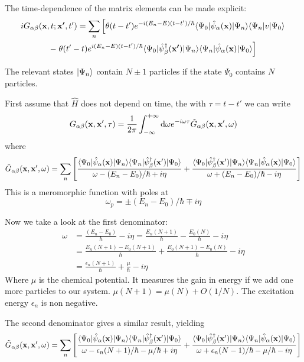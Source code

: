 The time-dependence of the matrix elements can be made explicit:
\begin{multline*}
iG_{\alpha\beta}(\vec{x},t;\vec{x'},t') = \sum_n \left[\theta(t-t')e^{-i(E_n-E)(t-t')/\hbar}\braket[\hat{\psi}_{\alpha}(\vec{x})]{\Psi_0}{\Psi_n}\braket[v]{\Psi_n}{\Psi_0}\right. \\
- \left.\theta(t'-t)e^{i(E_n-E)(t-t')/\hbar}\braket[\hat{\psi}^\dagger_{\beta}(\vec{x'})]{\Psi_0}{\Psi_n}\braket[\hat{\psi}_{\alpha}(\vec{x})]{\Psi_n}{\Psi_0}\right]
\end{multline*}

\begin{note}
The relevant states $\left| \Psi_n \right\rangle$ contain $N \pm 1$ particles if the state $\Psi_0$ contains $N$ particles.
\end{note}

First assume that $\hat{H}$ does not depend on time, the with $\tau=t-t'$ we can write
\[ G_{\alpha\beta}(\bm{\mathrm{x}},\bm{\mathrm{x}}',\tau) = \frac{1}{2\pi}\int^{+\infty}_{-\infty}\operatorname{d \!}{\omega}e^{-i\omega \tau}\tilde{G}_{\alpha\beta}(\bm{\mathrm{x}}, \bm{\mathrm{x}}',\omega) \]
where
\[ \tilde{G}_{\alpha\beta}(\vec{x}, \vec{x}', \omega) = \sum_n \left[\frac{\braket[\hat{\psi}_\alpha(\vec{x})]{\Psi_0}{\Psi_n}\braket[\hat{\psi}_\beta^\dagger(\vec{x}')]{\Psi_n}{\Psi_0}}{\omega-(E_n - E_0)/\hbar + i\eta} + \frac{\braket[\hat{\psi}_\beta^\dagger(\vec{x}')]{\Psi_0}{\Psi_n}\braket[\hat{\psi}_\alpha(\vec{x})]{\Psi_n}{\Psi_0}}{\omega+(E_n - E_0)/\hbar - i\eta} \right] \]
This is a meromorphic function with poles at
\[ \omega_p = \pm (E_n - E_0)/\hbar \mp i\eta \]


Now we take a look at the first denominator:
\begin{align*}
\omega &= \frac{(E_n - E_0)}{\hbar}-i\eta = \frac{E_n(N+1)}{\hbar} - \frac{E_0(N)}{\hbar} - i\eta  \\
&= \frac{E_n(N+1) - E_0(N+1)}{\hbar} + \frac{E_0(N+1)-E_0(N)}{\hbar} - i\eta \\
&= \frac{\epsilon_n(N+1)}{\hbar} + \frac{\mu}{\hbar} -i\eta
\end{align*}
Where $\mu$ is the chemical potential. It measures the gain in energy if we add one more particles to our system. $\mu(N+1) = \mu(N)+O(1/N)$. The excitation energy $\epsilon_n$ is non negative.

The second denominator gives a similar result, yielding
\[ \tilde{G}_{\alpha\beta}(\vec{x},\vec{x}', \omega) = \sum_n \left[\frac{\braket[\hat{\psi}_\alpha(\vec{x})]{\Psi_0}{\Psi_n}\braket[\hat{\psi}_\beta^\dagger(\vec{x}')]{\Psi_n}{\Psi_0}}{\omega-\epsilon_n(N+1)/\hbar- \mu/\hbar + i\eta} + \frac{\braket[\hat{\psi}_\beta^\dagger(\vec{x}')]{\Psi_0}{\Psi_n}\braket[\hat{\psi}_\alpha(\vec{x})]{\Psi_n}{\Psi_0}}{\omega+\epsilon_n(N-1)/\hbar -\mu/\hbar- i\eta} \right] \]



